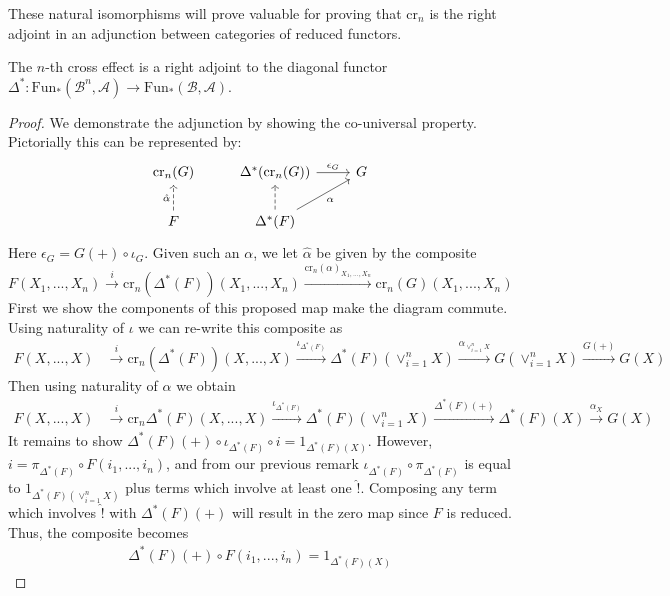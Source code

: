 These natural isomorphisms will prove valuable for proving that $\text{cr}_n$ is the right adjoint in an adjunction between categories of reduced functors.

\begin{prop}
    The $n$-th cross effect is a right adjoint to the diagonal functor $\Delta^*:\text{Fun}_*(\mathcal{B}^n,\mathcal{A})\rightarrow \text{Fun}_*(\mathcal{B},\mathcal{A})$.
\end{prop}
\begin{proof}
    We demonstrate the adjunction by showing the co-universal property. Pictorially this can be represented by:
    \[\begin{tikzcd}
    	{\text{cr}_n(G)} & {\Delta^*(\text{cr}_n(G))} & G \\
    	F & {\Delta^*(F)}
    	\arrow["{\epsilon_G}", from=1-2, to=1-3]
    	\arrow["\alpha"', from=2-2, to=1-3]
    	\arrow[dashed, from=2-2, to=1-2]
    	\arrow["{\hat{\alpha}}", dashed, from=2-1, to=1-1]
    \end{tikzcd}\]
    Here $\epsilon_G = G(+)\circ \iota_G$. Given such an $\alpha$, we let $\hat{\alpha}$ be given by the composite 
    \begin{equation*}
        F(X_1,...,X_n)\xrightarrow{i}\text{cr}_n(\Delta^*(F))(X_1,...,X_n)\xrightarrow{\text{cr}_n(\alpha)_{X_1,...,X_n}}\text{cr}_n(G)(X_1,...,X_n)
    \end{equation*}
    First we show the components of this proposed map make the diagram commute. Using naturality of $\iota$ we can re-write this composite as
    \begin{align*}
        F(X,...,X)&\xrightarrow{i}\text{cr}_n(\Delta^*(F))(X,...,X)\xrightarrow{\iota_{\Delta^*(F)}}\Delta^*(F)(\lor_{i=1}^nX) \xrightarrow{\alpha_{\lor_{i=1}^nX}}G(\lor_{i=1}^nX)\xrightarrow{G(+)}G(X)
    \end{align*}
    Then using naturality of $\alpha$ we obtain
    \begin{align*}
        F(X,...,X)&\xrightarrow{i}\text{cr}_n\Delta^*(F)(X,...,X)\xrightarrow{\iota_{\Delta^*(F)}}\Delta^*(F)(\lor_{i=1}^nX) \xrightarrow{\Delta^*(F)(+)}\Delta^*(F)(X)\xrightarrow{\alpha_X}G(X)
    \end{align*}
    It remains to show $\Delta^*(F)(+)\circ \iota_{\Delta^*(F)}\circ i = 1_{\Delta^*(F)(X)}$. However, $i = \pi_{\Delta^*(F)}\circ F(i_1,...,i_n)$, and from our previous remark $\iota_{\Delta^*(F)}\circ \pi_{\Delta^*(F)}$ is equal to $1_{\Delta^*(F)(\lor_{i=1}^nX)}$ plus terms which involve at least one $\hat{!}$. Composing any term which involves $\hat{!}$ with $\Delta^*(F)(+)$ will result in the zero map since $F$ is reduced. Thus, the composite becomes
    \begin{align*}
        \Delta^*(F)(+)\circ F(i_1,...,i_n) = 1_{\Delta^*(F)(X)}
    \end{align*}


\end{proof}
